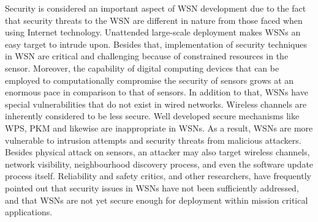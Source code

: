 \documentclass[conference]{IEEEtran}
\begin{document}
Security is considered an important aspect of WSN development due to the fact that  security threats to the WSN are different in nature from those faced when using Internet technology. %
Unattended large-scale deployment makes WSNs an easy target to intrude upon.
Besides that, implementation of security techniques in WSN are critical and challenging because of constrained resources in the sensor.
Moreover, the capability of digital computing devices that can be employed to computationally compromise the security of sensors grows at an enormous pace in comparison to that of sensors.
In addition to that, WSNs have special vulnerabilities that do not exist in wired networks.
Wireless channels are inherently considered to be less secure.
Well developed secure mechanisms like WPS, PKM and likewise are inappropriate in WSNs. %
As a result, WSNs are more vulnerable to intrusion attempts and security threats from malicious attackers.
Besides physical attack on sensors, an attacker may also target wireless channels, network visibility, neighbourhood discovery process, and even the software update process itself.
Reliability and safety critics, and other researchers, have frequently pointed out that security issues in WSNs have not been sufficiently addressed, and that WSNs are not yet secure enough for deployment within mission critical applications.

\end{document}
